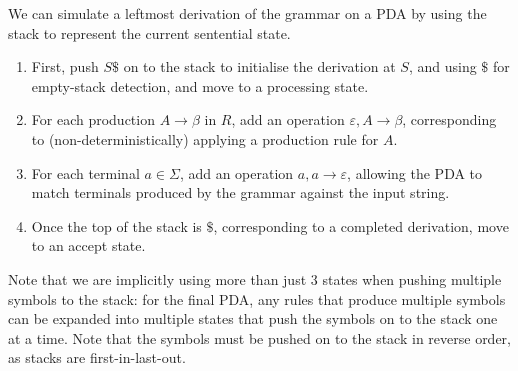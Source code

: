 \documentclass{article}
\theoremstyle{definition}
\theoremstyle{definition}
\theoremstyle{remark}
\begin{document}
We can simulate a leftmost derivation of the grammar on a PDA by using the stack to represent the current sentential state.
\begin{enumerate}
    \item First, push $S\$$ on to the stack to initialise the derivation at $S$, and using $\$$ for empty-stack detection, and move to a processing state.
    \item For each production $A\rightarrow\beta$ in $R$, add an operation $\varepsilon,A\rightarrow\beta$, corresponding to (non-deterministically) applying a production rule for $A$.
    \item For each terminal $a\in\Sigma$, add an operation $a,a\rightarrow\varepsilon$, allowing the PDA to match terminals produced by the grammar against the input string.
    \item Once the top of the stack is $\$$, corresponding to a completed derivation, move to an accept state.
\end{enumerate}
\begin{center}
\end{center}
Note that we are implicitly using more than just $3$ states when pushing multiple symbols to the stack: for the final PDA, any rules that produce multiple symbols can be expanded into multiple states that push the symbols on to the stack one at a time. Note that the symbols must be pushed on to the stack in reverse order, as stacks are first-in-last-out.
\end{document}
